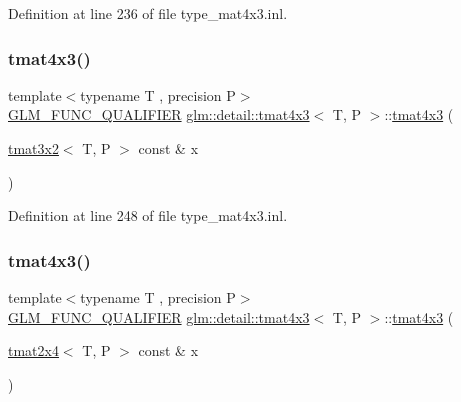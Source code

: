 Definition at line 236 of file type\+\_\+mat4x3.\+inl.

\mbox{\label{structglm_1_1detail_1_1tmat4x3_a140b3c892ad92f44172c0bd478fe2f93}} 
\subsubsection{\texorpdfstring{tmat4x3()}{tmat4x3()}\hspace{0.1cm}{\footnotesize\ttfamily [15/22]}}
{\footnotesize\ttfamily template$<$typename T , precision P$>$ \\
\hyperlink{setup_8hpp_a33fdea6f91c5f834105f7415e2a64407}{G\+L\+M\+\_\+\+F\+U\+N\+C\+\_\+\+Q\+U\+A\+L\+I\+F\+I\+ER} \hyperlink{structglm_1_1detail_1_1tmat4x3}{glm\+::detail\+::tmat4x3}$<$ T, P $>$\+::\hyperlink{structglm_1_1detail_1_1tmat4x3}{tmat4x3} (\begin{DoxyParamCaption}\item[{\hyperlink{structglm_1_1detail_1_1tmat3x2}{tmat3x2}$<$ T, P $>$ const \&}]{x }\end{DoxyParamCaption})\hspace{0.3cm}{\ttfamily [explicit]}}



Definition at line 248 of file type\+\_\+mat4x3.\+inl.

\mbox{\label{structglm_1_1detail_1_1tmat4x3_a41cdb2fb9a8aa0b0319cc4b8beb7f6a6}} 
\subsubsection{\texorpdfstring{tmat4x3()}{tmat4x3()}\hspace{0.1cm}{\footnotesize\ttfamily [16/22]}}
{\footnotesize\ttfamily template$<$typename T , precision P$>$ \\
\hyperlink{setup_8hpp_a33fdea6f91c5f834105f7415e2a64407}{G\+L\+M\+\_\+\+F\+U\+N\+C\+\_\+\+Q\+U\+A\+L\+I\+F\+I\+ER} \hyperlink{structglm_1_1detail_1_1tmat4x3}{glm\+::detail\+::tmat4x3}$<$ T, P $>$\+::\hyperlink{structglm_1_1detail_1_1tmat4x3}{tmat4x3} (\begin{DoxyParamCaption}\item[{\hyperlink{structglm_1_1detail_1_1tmat2x4}{tmat2x4}$<$ T, P $>$ const \&}]{x }\end{DoxyParamCaption})\hspace{0.3cm}{\ttfamily [explicit]}}



